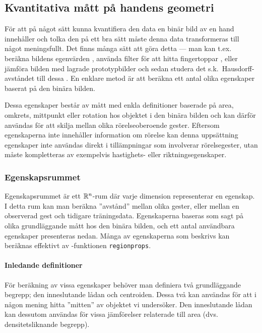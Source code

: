 \documentclass[../rapport_MVEX01-11-05]{subfiles}
\begin{document}
\subsection{Kvantitativa mått på handens geometri}\label{sec:features}

För att på något sätt kunna kvantifiera den data en binär bild av en hand 
innehåller och tolka den på ett bra sätt måste denna data transformeras till
något meningsfullt. Det finns många sätt att göra detta --- man kan t.ex.~
beräkna bildens egenvärden \cite{Funck02}, använda filter för att hitta
fingertoppar \cite{Noelker97}, eller jämföra bilden med lagrade prototypbilder
och sedan studera det s.k.~Hausdorff-avståndet till dessa \cite{Nielsen04}.
En enklare metod
är att beräkna ett antal olika egenskaper baserat på den binära bilden.

Dessa egenskaper består av mått med enkla definitioner baserade på area,
omkrets, mittpunkt eller rotation hos objektet i den binära bilden och kan
därför användas för att skilja mellan olika rörelseoberoende
gester. Eftersom egenskaperna inte innehåller information om rörelse kan denna
uppsättning egenskaper inte användas direkt i tillämpningar som involverar
rörelsegester, utan måste kompletteras av exempelvis hastighets- eller
riktningsegenskaper.

\subsubsection{Egenskapsrummet}

Egenskapsrummet är ett $\mathbb{R}^n$-rum där varje dimension representerar en
egenskap. I detta rum kan man beräkna ''avstånd'' mellan olika gester,
eller mellan en observerad gest och tidigare träningsdata. Egenskaperna baseras som sagt
på olika grundläggande mått hos den binära bilden, och ett antal användbara
egenskaper presenteras nedan.
Många av egenskaperna som beskrivs kan beräknas effektivt av
\MATLAB-funktionen \texttt{regionprops}.

\paragraph{Inledande definitioner}

För beräkning av vissa egenskaper behöver man definiera två
grundläggande begrepp; den inneslutande lådan och centroiden. Dessa
två kan användas för att i någon mening hitta ''mitten'' av objektet
vi undersöker. Den inneslutande lådan kan dessutom användas för vissa
jämförelser relaterade till area (dvs. densitetsliknande begrepp).
\end{document}
